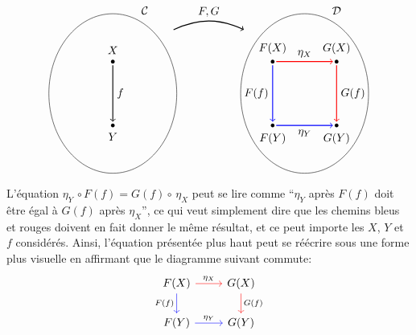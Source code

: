 \[
\begin{tikzpicture}
    \draw (2,2) ellipse (2cm and 2.5cm);
    \node(C) at (3,4.6) {$\C$};

    \draw (2,3) node[circle, inner sep=1.2pt, outer sep=1.5pt, fill=black, label={above:{$X$}}] (X) {};
    \draw (2,1) node[circle, inner sep=1.2pt, outer sep=1.5pt, fill=black, label={below:{$Y$}}] (Y) {};
    \draw [thick, ->] (X) -- node[right] {$f$} (Y);

    \draw (8,2) ellipse (2cm and 2.5cm);
    \node(D) at (9,4.6) {$\D$};
    \draw (7,3) node[circle, inner sep=1.2pt, outer sep=1.5pt, fill=black, label={above:{$F(X)$}}] (FX) {};
    \draw (7,1) node[circle, inner sep=1.2pt, outer sep=1.5pt, fill=black, label={below:{$F(Y)$}}] (FY) {};
    \draw [blue, thick, ->] (FX) -- node[color=black, left] {$F(f)$} (FY);

    \draw (9,3) node[circle, inner sep=1.2pt, outer sep=1.5pt, fill=black, label={above:{$G(X)$}}] (GX) {};
    \draw (9,1) node[circle, inner sep=1.2pt, outer sep=1.5pt, fill=black, label={below:{$G(Y)$}}] (GY) {};
    \draw [red, thick, ->] (GX) -- node[color=black, right] {$G(f)$} (GY);

    \draw [thick, ->] (3.9,4) to [bend left=25] node[above] {$F,G$} (6.1,4);

    \draw [red, thick, ->] (FX) -- node[color=black, above] {$\eta_X$} (GX);
    \draw [blue, thick, ->] (FY) -- node[color=black, below] {$\eta_Y$} (GY);
\end{tikzpicture}
\]

L'équation $\eta_Y \, \circ F(f) = G(f) \circ \, \eta_X$ peut se lire comme
``$\eta_Y$ après $F(f)$ doit être égal à $G(f)$ après $\eta_X$'', ce
qui veut simplement dire que les chemins bleus et rouges doivent en fait
donner le même résultat, et ce peut importe les $X$, $Y$ et $f$ considérés.
Ainsi, l'équation présentée plus haut peut se réécrire sous une forme plus
visuelle en affirmant que le diagramme suivant commute:
\[
\begin{tikzcd}
    F(X) \arrow[d, blue, "F(f)"' black] \arrow[r, red, "\eta_X" black] & G(X) \arrow[d, red, "G(f)" black] \\
    F(Y) \arrow[r, blue, "\eta_Y" black] & G(Y)
\end{tikzcd}
\]


